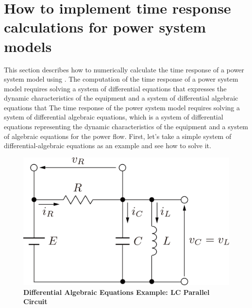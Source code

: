 \documentclass[tombow,dvipdfmx]{corona-a5-1.1}
\begin{document}
\section{How to implement time response calculations for power system models}\label{sec:timerescal}

This section describes how to numerically calculate the time response of a power system model using \matlab.
The computation of the time response of a power system model requires solving a system of differential equations that expresses the dynamic characteristics of the equipment and a system of differential algebraic equations that The time response of the power system model requires solving a system of differential algebraic equations, which is a system of differential equations representing the dynamic characteristics of the equipment and a system of algebraic equations for the power flow.
First, let's take a simple system of differential-algebraic equations as an example and see how to solve it.

\begin{figure}[t]
  \centering
  \includegraphics[width = .5\linewidth]{figs/circkawaguchi}
  \medskip
  \caption{\textbf{Differential Algebraic Equations Example: LC Parallel Circuit}}
  \label{fig:RLC}
  \medskip
\end{figure}
\end{document}
